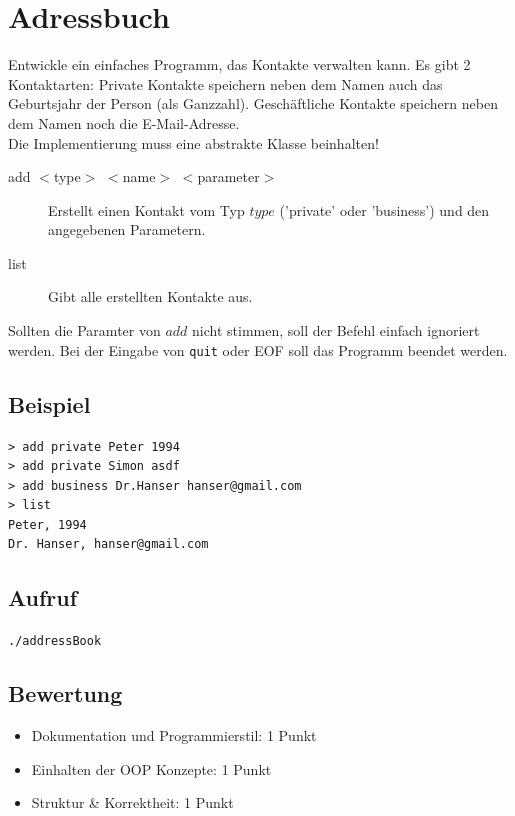 \documentclass[a4paper,10pt]{article}
\begin{document}
\section*{Adressbuch}
Entwickle ein einfaches Programm, das Kontakte verwalten kann. Es gibt 2 Kontaktarten: Private Kontakte speichern neben dem Namen auch das Geburtsjahr der Person (als Ganzzahl). Geschäftliche Kontakte speichern neben dem Namen noch die E-Mail-Adresse. \\ Die Implementierung muss eine abstrakte Klasse beinhalten!

\begin{description}
 \item[add $<$type$>$ $<$name$>$ $<$parameter$>$] Erstellt einen Kontakt vom Typ $type$ ('private' oder 'business') und den angegebenen Parametern. 
 \item[list] Gibt alle erstellten Kontakte aus. 
\end{description}

Sollten die Paramter von $add$ nicht stimmen, soll der Befehl einfach ignoriert werden.
Bei der Eingabe von \texttt{quit} oder EOF soll das Programm beendet werden.


\subsection*{Beispiel}
\begin{verbatim}
> add private Peter 1994
> add private Simon asdf
> add business Dr.Hanser hanser@gmail.com
> list
Peter, 1994
Dr. Hanser, hanser@gmail.com
\end{verbatim}

\subsection*{Aufruf}
\texttt{./addressBook}

\subsection*{Bewertung}
\begin{itemize}
 \item Dokumentation und Programmierstil: 1 Punkt
 \item Einhalten der OOP Konzepte: 1 Punkt
 \item Struktur \& Korrektheit: 1 Punkt
\end{itemize}

\newpage
\end{document}
